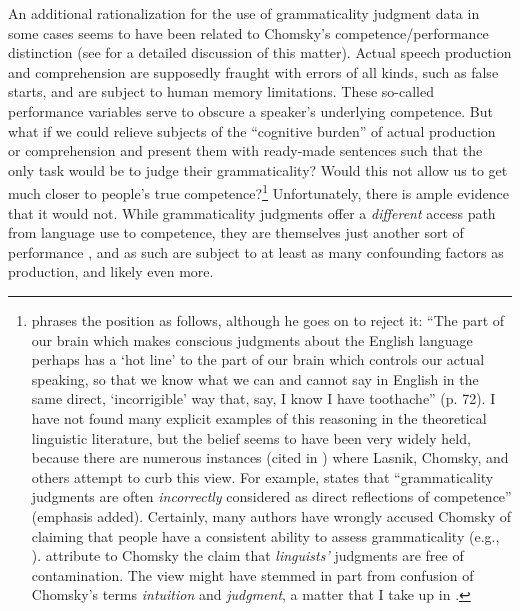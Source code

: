 An additional rationalization for the use of grammaticality judgment data in some cases seems to have been related to Chomsky's competence/per\-form\-ance distinction (see  for a detailed discussion of this matter). Actual speech production and comprehension are supposedly fraught with errors of all kinds, such as false starts, and are subject to human memory limitations. These so-called performance variables serve to obscure a speaker's underlying competence. But what if we could relieve subjects of the ``cognitive burden'' of actual production or comprehension and present them with ready-made sentences such that the only task would be to judge their grammaticality? Would this not allow us to get much closer to people's true competence?\footnote{\citet{Sampson1975} phrases the position as follows, although he goes on to reject it: ``The part of our brain which makes conscious judgments about the English language perhaps has a `hot line' to the part of our brain which controls our actual speaking, so that we know what we can and cannot say in English in the same direct, `incorrigible' way that, say, I know I have toothache'' (p. 72). I have not found many explicit examples of this reasoning in the theoretical linguistic literature, but the belief seems to have been very widely held, because there are numerous instances (cited in \citet{Birdsong1989}) where Lasnik, Chomsky, and others attempt to curb this view. For example, \citet[20]{Lasnik1981} states that ``grammaticality judgments are often \textit{incorrectly} considered as direct reflections of competence'' (emphasis added). Certainly, many authors have wrongly accused Chomsky of claiming that people have a consistent ability to assess grammaticality (e.g., \citealt{Nagata1988}). \citet[11]{GleitmanEtAl1970} attribute to Chomsky the claim that \textit{linguists'} judgments are free of contamination. The view might have stemmed in part from confusion of Chomsky's terms \textit{intuition} and \textit{judgment}, a matter that I take up in .}
 Unfortunately, there is ample evidence that it would not. While grammaticality judgments offer a \textit{different} access path from language use to competence, they are themselves just another sort of performance \citep{Birdsong1989,LeveltEtAl1977,Bever1970b,Bever1974,BeverEtAl1971,Grandy1981}, and as such are subject to at least as many confounding factors as production, and likely even more.


